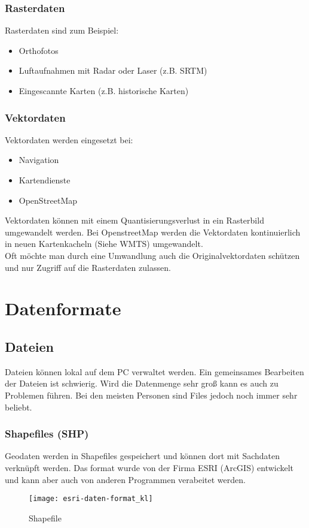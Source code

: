 \documentclass[11pt,fleqn]{book} %
\begin{document}
\subsection{Rasterdaten}

Rasterdaten sind zum Beispiel:
\begin{itemize}
\item Orthofotos
\item Luftaufnahmen mit Radar oder Laser (z.B. SRTM)
\item Eingescannte Karten (z.B. historische Karten)
\end{itemize}

\subsection{Vektordaten}

Vektordaten werden eingesetzt bei:
\begin{itemize}
\item Navigation
\item Kartendienste
\item OpenStreetMap
\end{itemize}

Vektordaten können mit einem Quantisierungsverlust in ein Rasterbild umgewandelt werden. Bei OpenstreetMap werden die Vektordaten kontinuierlich in neuen Kartenkacheln (Siehe WMTS)
umgewandelt. \\
Oft m\"ochte man durch eine Umwandlung auch die Originalvektordaten sch\"utzen und nur Zugriff auf die Rasterdaten zulassen.   



\chapter{Datenformate}
\section{Dateien}
Dateien k\"onnen lokal auf dem PC verwaltet werden. Ein gemeinsames Bearbeiten der Dateien ist schwierig. Wird die Datenmenge sehr gro{\ss} kann es auch zu Problemen f\"uhren. Bei den meisten Personen sind Files jedoch noch immer sehr beliebt.
\subsection{Shapefiles (SHP)}
Geodaten werden in Shapefiles gespeichert und k\"onnen dort mit Sachdaten verkn\"upft werden.  Das format wurde von der Firma ESRI (ArcGIS) entwickelt und kann aber auch von anderen Programmen verabeitet werden.
\begin{figure}[h]
\centering\texttt{[image: esri-daten-format\_kl]}
\caption{Shapefile}
\end{figure}
\end{document}
